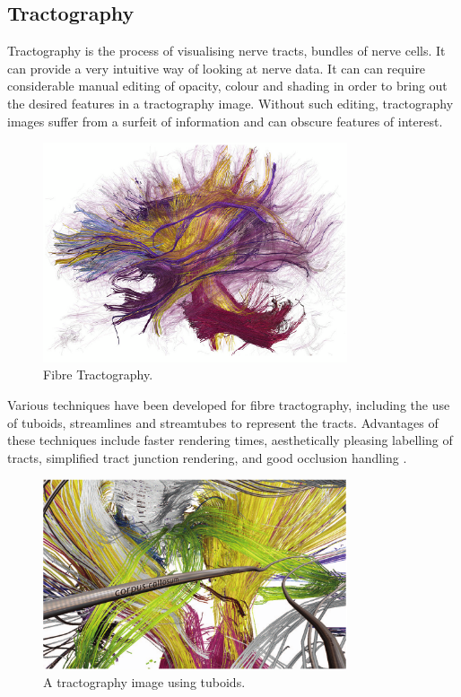 \documentclass[MSc,paper=a4,pagesize=auto]{icldt}
\begin{document}
\subsection{Tractography}
Tractography is the process of visualising nerve tracts, bundles of nerve cells. It can provide a very intuitive way of looking at nerve data. It can can require considerable manual editing of opacity, colour and shading in order to bring out the desired features in a tractography image. Without such editing, tractography images suffer from a surfeit of information and can obscure features of interest.

\begin{figure}[htbp!]
    \centering
    \includegraphics[width=0.8\textwidth]{resources/tractography}
    \caption{Fibre Tractography. \cite{Odonnell2006}}
    \label{fig:tractography}
\end{figure}

Various techniques have been developed for fibre tractography, including the use of tuboids, streamlines and streamtubes to represent the tracts. Advantages of these techniques include faster rendering times, aesthetically pleasing labelling of tracts, simplified tract junction rendering, and good occlusion handling \cite{Petrovic2007}.

\begin{figure}[htbp!]
    \centering
    \includegraphics[width=0.8\textwidth]{resources/tuboids}
    \caption{A tractography image using tuboids. \cite{Petrovic2007}}
    \label{fig:tuboids}
\end{figure}
\end{document}
